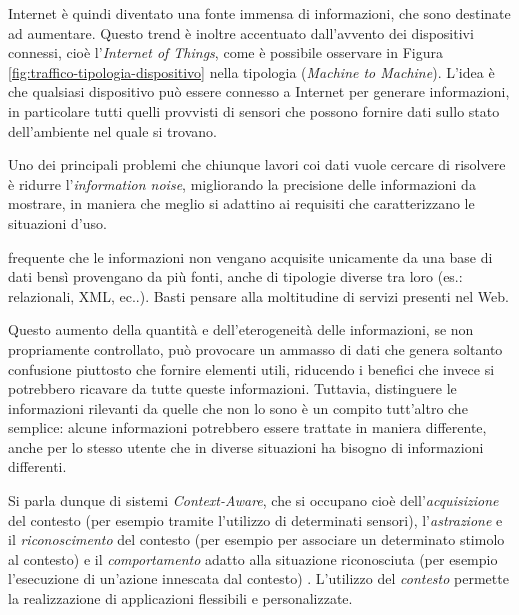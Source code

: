 Internet è quindi diventato una fonte immensa di informazioni, che sono destinate ad aumentare. Questo trend è inoltre accentuato dall'avvento dei dispositivi connessi, cioè l'\emph{Internet of Things}, come è possibile osservare in Figura \ref{fig:traffico-tipologia-dispositivo} nella tipologia  (\emph{Machine to Machine}). L'idea è che qualsiasi dispositivo può essere connesso a Internet per generare informazioni, in particolare tutti quelli provvisti di sensori che possono fornire dati sullo stato dell'ambiente nel quale si trovano.

Uno dei principali problemi che chiunque lavori coi dati vuole cercare di risolvere è ridurre l'\emph{information noise}, migliorando la precisione delle informazioni da mostrare, in maniera che meglio si adattino ai requisiti che caratterizzano le situazioni d'uso.

\upe frequente che le informazioni non vengano acquisite unicamente da una base di dati bensì provengano da più fonti, anche di tipologie diverse tra loro (es.: relazionali, XML, ec..). Basti pensare alla moltitudine di servizi presenti nel Web.

Questo aumento della quantità e dell'eterogeneità delle informazioni, se non propriamente controllato, può provocare un ammasso di dati che genera soltanto confusione piuttosto che fornire elementi utili, riducendo i benefici che invece si potrebbero ricavare da tutte queste informazioni. Tuttavia, distinguere le informazioni rilevanti da quelle che non lo sono è un compito tutt'altro che semplice: alcune informazioni potrebbero essere trattate in maniera differente, anche per lo stesso utente che in diverse situazioni ha bisogno di informazioni differenti. 

Si parla dunque di sistemi \emph{Context-Aware}, che si occupano cioè dell'\emph{acquisizione} del contesto (per esempio tramite l'utilizzo di determinati sensori), l'\emph{astrazione} e il \emph{riconoscimento} del contesto (per esempio per associare un determinato stimolo al contesto) e il \emph{comportamento} adatto alla situazione riconosciuta (per esempio l'esecuzione di un'azione innescata dal contesto) \cite{schmidt2003ubiquitous}. L'utilizzo del \emph{contesto} permette la realizzazione di applicazioni flessibili e personalizzate. 


